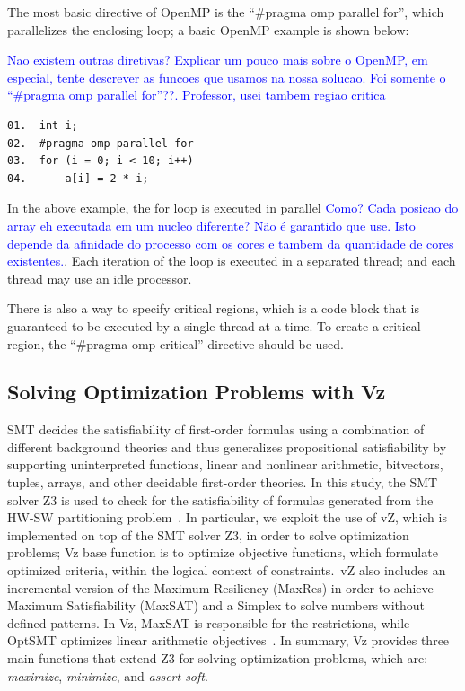 The most basic directive of OpenMP is the ``\#pragma omp parallel for'', which parallelizes the enclosing loop; a basic OpenMP example is shown below:

\textcolor{blue}{Nao existem outras diretivas? Explicar um pouco mais sobre o OpenMP, em especial, tente descrever as funcoes que usamos na nossa solucao. Foi somente o ``\#pragma omp parallel for''??. Professor, usei tambem regiao critica}

\begin{lstlisting}[caption=OpenMP basic sample]
01.  int i;
02.  #pragma omp parallel for
03.  for (i = 0; i < 10; i++)
04.      a[i] = 2 * i;
\end{lstlisting}

In the above example, the for loop is executed in parallel \textcolor{blue}{Como? Cada posicao do array eh executada em um nucleo diferente? Não é garantido que use. Isto depende da afinidade do processo com os cores e tambem da quantidade de cores existentes.}. Each iteration of the loop is executed in a separated thread; and each thread may use an idle processor.

There is also a way to specify critical regions, which is a code block that is guaranteed to be executed by a single thread at a time. To create a critical region, the ``\#pragma omp critical'' directive should be used.
\subsection{Solving Optimization Problems with Vz}
\label{Optimization-with-Vz}

SMT decides the satisfiability of first-order formulas using a combination of different background theories and thus generalizes propositional satisfiability by supporting uninterpreted functions, linear and nonlinear arithmetic, bitvectors, tuples, arrays, and other decidable first-order theories. In this study, the SMT solver Z3 is used to check for the satisfiability of formulas generated from the HW-SW partitioning problem~\cite{Bjorner2014}. In particular, we exploit the use of vZ, which is implemented on top of the SMT solver Z3, in order to solve optimization problems; Vz base function is to optimize objective functions, which formulate optimized criteria, within the logical context of constraints.~vZ also includes an incremental version of the Maximum Resiliency (MaxRes) \cite{Federica2008} in order to achieve Maximum Satisfiability (MaxSAT) \cite{NarodytskaN} and a Simplex to solve numbers without defined patterns. In Vz, MaxSAT is responsible for the restrictions, while OptSMT optimizes linear arithmetic objectives~\cite{Bjorner2015}. In summary, Vz provides three main functions that extend Z3 for solving optimization problems, which are: \textit{maximize}, \textit{minimize}, and \textit{assert-soft}.


